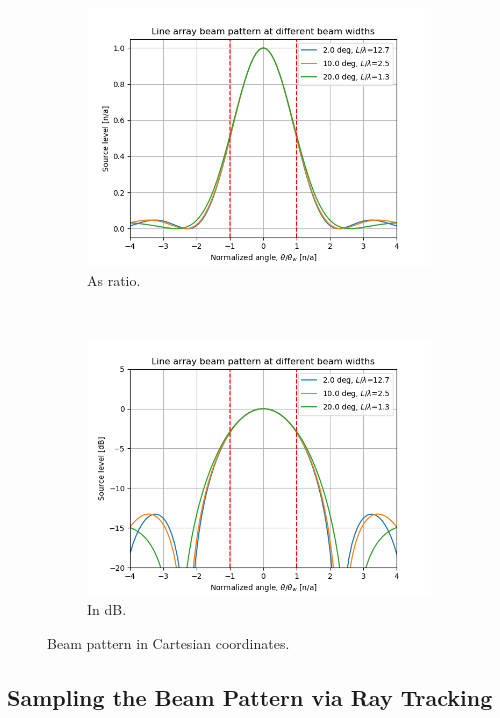 \documentclass[11pt]{article}
\begin{document}
\begin{figure}[hb!]
  \centering
  \begin{subfigure}[t]{0.5\textwidth}
    \centering
    \includegraphics[width=\textwidth]{src/single_beam/linebp_ratio.png}
    \caption{As ratio.}
  \end{subfigure}%
  ~ 
  \begin{subfigure}[t]{0.5\textwidth}
    \centering
    \includegraphics[width=\textwidth]{src/single_beam/linebp_db.png}
    \caption{In dB.}
  \end{subfigure}
  \caption{Beam pattern in Cartesian coordinates. }
  \label{f:linebp}
\end{figure}

\subsection{Sampling the Beam Pattern via Ray Tracking}
\end{document}
